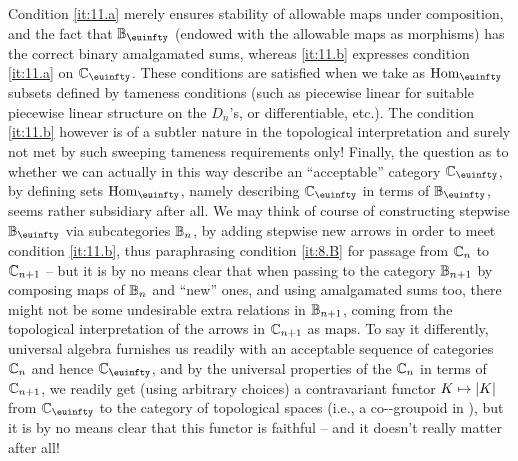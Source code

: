Condition \ref{it:11.a} merely ensures stability of allowable maps
under composition, and the fact that $\bB_\oo$ (endowed with the
allowable maps as morphisms) has the correct binary amalgamated sums,
whereas \ref{it:11.b} expresses condition \ref{it:11.a} on $\bC_\oo$.
These conditions are satisfied when we take as $\Hom_\oo$
subsets defined by tameness conditions (such as piecewise linear for
suitable piecewise linear structure on the $D_n$'s, or differentiable,
etc.). The condition \ref{it:11.b} however is of a subtler nature in
the topological interpretation and surely not met by such sweeping
tameness requirements only! Finally, the question as to whether we can
actually in this way describe an ``acceptable'' category $\bC_\oo$,
by defining sets $\Hom_\oo$, namely describing $\bC_\oo$ in terms
of $\bB_\oo$, seems rather subsidiary after all. We may think of
course of constructing stepwise $\bB_\oo$ via subcategories ${\mathbb{B}}_n$,
by adding stepwise new arrows in order to meet condition
\ref{it:11.b}, thus paraphrasing condition \ref{it:8.B} for passage
from ${\mathbb{C}}_n$ to ${\mathbb{C}}_{n+1}$ -- but it is by no means clear that
when passing to the category ${\mathbb{B}}_{n+1}$ by composing maps of ${\mathbb{B}}_n$
and ``new'' ones, and using amalgamated sums too, there might not
be some undesirable extra relations in ${\mathbb{B}}_{n+1}$, coming from the
topological interpretation of the arrows in ${\mathbb{C}}_{n+1}$ as maps. To
say it differently, universal algebra furnishes us readily with an
acceptable sequence of categories ${\mathbb{C}}_n$ and hence $\bC_\oo$,
and by the universal properties of the ${\mathbb{C}}_n$ in terms of
${\mathbb{C}}_{n+1}$, we readily get (using arbitrary choices) a contravariant
functor $K \mapsto \lvert K\rvert$ from $\bC_\oo$ to the category of
topological spaces (i.e., a co-\oo-groupoid in \cTop), but it is by no
means clear that this functor is faithful -- and it doesn't really
matter after all!

